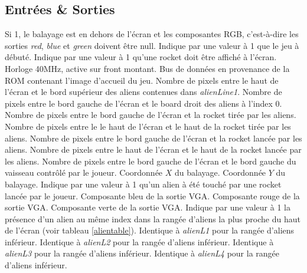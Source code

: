 \documentclass[french]{nakrule}
\begin{document}
\clearpage

\subsection{Entrées \& Sorties}
\label{subsec:Entrées_Sorties_dmc}

\begin{descr}
   Si 1, le balayage est en dehors de l'écran et les
  composantes RGB, c'est-à-dire les sorties \emph{red}, \emph{blue} et
  \emph{green} doivent être null.
   Indique par une valeur à 1 que le jeu à débuté.
   Indique par une valeur à 1 qu'une rocket doit être
  affiché à l'écran.
   Horloge 40MHz, active sur front montant.
   Bus de données en provenance de la ROM contenant
  l'image d'accueil du jeu.
   Nombre de pixels entre le haut de l'écran et le bord
  supérieur des aliens contenues dans \emph{alienLine1}.
   Nombre de pixels entre le bord gauche de l'écran et le
  board droit des aliens à l'index 0.
   Nombre de pixels entre le bord gauche de l'écran et
  la rocket tirée par les aliens.
   Nombre de pixels entre le le haut de l'écran et le
  haut de la rocket tirée par les aliens.
   Nombre de pixels entre le bord gauche de l'écran et la rocket
  lancée par les aliens.
   Nombre de pixels entre le haut de l'écran et le haut de la rocket
  lancée par les aliens.
   Nombre de pixels entre le bord gauche de l'écran et
  le bord gauche du vaisseau contrôlé par le joueur.
   Coordonnée $X$ du balayage.
   Coordonnée $Y$ du balayage.
   Indique par une valeur à 1 qu'un alien à été touché
  par une rocket lancée par le joueur.
   Composante bleu de la sortie VGA.
   Composante rouge de la sortie VGA.
   Composante verte de la sortie VGA.
   Indique par une valeur à 1 la présence d'un alien au même
  index dans la rangée d'aliens la plus proche du haut de l'écran (voir tableau
  \ref{alientable}).
   Identique à \emph{alienL1} pour la rangée d'aliens inférieur.
   Identique à \emph{alienL2} pour la rangée d'aliens inférieur.
   Identique à \emph{alienL3} pour la rangée d'aliens inférieur.
   Identique à \emph{alienL4} pour la rangée d'aliens inférieur.
\end{descr}
\end{document}

